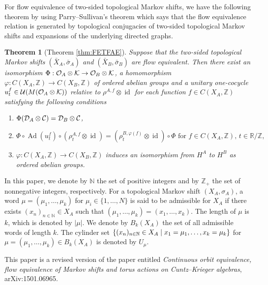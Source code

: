 \documentclass[11pt]{article}
\newtheorem{theorem}{Theorem}[section]
\theoremstyle{plain}
\theoremstyle{definition}
\numberwithin{equation}{section}
\renewcommand{\labelenumi}{\textup{(\theenumi)}}
\newcommand{\id}{\operatorname{id}}
\newcommand{\Ad}{\operatorname{Ad}}
\newcommand{\N}{\mathbb{N}}
\newcommand{\RZ}{\mathbb{R}/{\mathbb{Z}}}
\newcommand{\Z}{\mathbb{Z}}
\newcommand{\Zp}{{\mathbb{Z}}_+}
\begin{document}
For flow equivalence of two-sided topological Markov shifts,
we have the following theorem
by using Parry--Sullivan's theorem \cite{PS} 
which says that the flow equivalence relation is 
generated by topological conjugacies of two-sided topological Markov shifts and expansions of the underlying directed graphs.
\begin{theorem}[{Theorem \ref{thm:FETFAE}}]
Suppose that the two-sided topological Markov shifts
$(\bar{X}_A, \bar{\sigma}_A)$ and $(\bar{X}_B,\bar{\sigma}_B)$
are flow equivalent.
Then there exist an isomorphism
$\Phi:{{\mathcal{O}}_A}\otimes{\mathcal{K}} \rightarrow {{\mathcal{O}}_B}\otimes{\mathcal{K}}$,
a homomorphism
$\varphi:C(X_A,\Z) \rightarrow C(X_B,\Z)$
of ordered abelian groups
and 
a unitary one-cocycle
 $u_t^f \in {{\mathcal{U}}}(M({{\mathcal{O}}_A}\otimes{\mathcal{K}}))$ relative to 
$\rho^{A,f} \otimes\id$
for each function
$f\in C(X_A,\Z)$
satisfying the following conditions
\begin{enumerate}
\renewcommand{\theenumi}{\roman{enumi}}
\renewcommand{\labelenumi}{\textup{(\theenumi)}}
\item
$\Phi({{\mathcal{D}}_A}\otimes{\mathcal{C}}) = {{\mathcal{D}}_B}\otimes{\mathcal{C}}$,
\item
$\Phi \circ \Ad(u_t^f) \circ (\rho^{A,f}_t\otimes \id)
 = (\rho^{B,\varphi(f)}_t\otimes\id) \circ \Phi
\text{ for }
 f \in C(X_A,\Z), \, t \in \RZ,
$
\item
$\varphi:C(X_A,\Z) \rightarrow C(X_B,\Z)$
induces 
an isomorphism
from  
$H^A$
to  $H^B$
as ordered abelian groups.
\end{enumerate}
\end{theorem}
\medskip


In this paper,
we denote 
by $\N$
the set of positive integers
and
by $\Zp$
the set of nonnegative integers,
respectively.
For a topological Markov shift
$(X_A,\sigma_A)$,
a word $\mu =(\mu_1, \dots, \mu_k)$ 
for $\mu_i \in \{1,\dots,N\}$
is said to be admissible for $X_A$ 
if there exists 
$(x_n)_{n \in \N} \in X_A$ 
such that 
$(\mu_1, \dots, \mu_k) =(x_1, \dots, x_k)$.
The length of $\mu$ is $k$, 
which is denoted by $|\mu|$.
 We denote by 
$B_k(X_A)$ the set of all admissible words of length $k$.
The cylinder set 
$\{ (x_n )_{n \in \Bbb N} \in X_A 
\mid x_1 =\mu_1,\dots, x_k = \mu_k \}$
for $\mu=(\mu_1,\dots,\mu_k) \in B_k(X_A)$
is denoted by $U_\mu$.  

\medskip

This paper is a revised version of the paper entitled 
{\it Continuous orbit equivalence, flow equivalence of Markov shifts and torus actions on Cuntz--Krieger algebras}, arXiv:1501.06965.  
\end{document}

